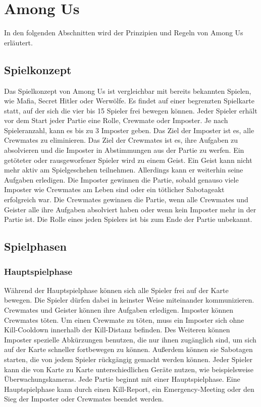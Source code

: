 \section{Among Us}
In den folgenden Abschnitten wird der Prinzipien und Regeln von Among Us
erläutert.
\subsection{Spielkonzept}
Das Spielkonzept von Among Us ist vergleichbar mit bereits bekannten Spielen,
wie Mafia, Secret Hitler oder Werwölfe.
\newline
Es findet auf einer begrenzten
Spielkarte statt, auf der sich die vier bis 15 Spieler frei bewegen können.
Jeder Spieler erhält vor dem Start jeder Partie eine Rolle, Crewmate oder
Imposter. Je nach Spieleranzahl, kann es bis zu 3 Imposter geben. Das Ziel der
Imposter ist es, alle Crewmates zu eliminieren. Das Ziel der Crewmates ist es,
ihre Aufgaben zu absolvieren und die Imposter in Abstimmungen aus der Partie zu
werfen. Ein getöteter oder rausgeworfener Spieler wird zu einem Geist.
Ein Geist kann nicht mehr aktiv am Spielgeschehen teilnehmen. Allerdings kann er
weiterhin seine Aufgaben erledigen.
\newline
Die Imposter gewinnen die Partie, sobald genauso viele Imposter wie Crewmates
am Leben sind oder ein tötlicher Sabotageakt erfolgreich war. Die Crewmates
gewinnen die Partie, wenn alle Crewmates und Geister alle ihre Aufgaben absolviert haben oder
wenn kein Imposter mehr in der Partie ist. Die Rolle eines jeden Spielers ist
bis zum Ende der Partie unbekannt.

\subsection{Spielphasen}
\subsubsection{Hauptspielphase}
Während der Hauptspielphase können sich alle Spieler frei auf der Karte bewegen.
Die Spieler dürfen dabei in keinster Weise miteinander kommunizieren.
Crewmates und Geister können ihre Aufgaben erledigen. Imposter können Crewmates
töten. Um einen Crewmate zu töten, muss ein Imposter sich ohne Kill-Cooldown
innerhalb der Kill-Distanz befinden.
Des Weiteren können Imposter spezielle Abkürzungen benutzen, die nur
ihnen zugänglich sind, um sich auf der Karte schneller fortbewegen zu können.
Außerdem können sie Sabotagen starten, die von jedem Spieler rückgängig
gemacht werden können. Jeder Spieler kann die von Karte zu Karte
unterschiedlichen Geräte nutzen, wie beispielsweise Überwachungskameras.
\newline
Jede Partie beginnt mit einer Hauptspielphase. Eine Hauptspielphase kann durch
einen Kill-Report, ein Emergency-Meeting oder den Sieg der Imposter oder
Crewmates beendet werden.

